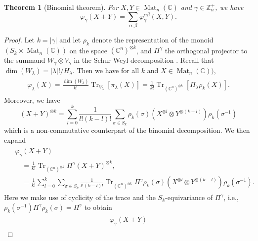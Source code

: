\documentclass[notitlepage, 11pt, letterpaper]{amsart}
\theoremstyle{plain}
\newtheorem{thm}{Theorem}%
\theoremstyle{definition}
\let\cref\crtcref
\DeclareMathOperator{\Tr}{Tr}
\DeclareMathOperator{\Mat}{Mat}
\newcommand{\undomweightsp}[1]{\mathbb Z^{+}_{#1}}
\newcommand{\ot}{\otimes} %
\newcommand{\vp}{\varphi} %
\newcommand{\ya}{\alpha}
\newcommand{\yb}{\beta}
\newcommand{\yc}{\gamma}
\newcommand{\yx}{\lambda}
\newcommand{\syc}{|\yc|}
\newcommand{\syx}{|\yx|}
\begin{document}
\begin{thm}[Binomial theorem]
    \label{thm:the_binomial_theorem}
    For $X,Y \in \Mat_n(\mathbb{C})$ and $\yc \in \undomweightsp{n}$, we have
    \begin{equation}
        \label{eq:varphi_sum_sum}
        \vp_\yc(X+Y)=\sum_{\ya, \yb} \vp^{\ya \yb}_\yc(X, Y).
    \end{equation}
\end{thm}
\begin{proof}
    Let $k=\syc$ and let $\rho_k$ denote the representation of the monoid $(S_k \times \Mat_n(\mathbb{C}))$ on the space $(\mathbb{C}^n)^{\ot k}$, and $\Pi^\yc$ the orthogonal projector to the summand $W_\yc \ot V_\yc$ in the Schur-Weyl decomposition \cref{eq:schur-weyl}.
    Recall that $\dim(W_{\yx}) = \syx! / H_{\yx}$.
    Then we have for all $k$ and $X \in \Mat_n(\mathbb{C}))$,
    \begin{align}
        \begin{split}
            \vp_{\yx}(X)
            = \frac{\dim(W_{\yx})}{k!} \Tr_{V_\yx}[\pi_\yx(X)]
            = \frac{1}{k!} \Tr_{(\mathbb{C}^n)^{\ot k}}[\Pi_{\yx} \rho_{k}(X)].
        \end{split}
    \end{align}
    Moreover, we have
    \begin{equation}
        (X+Y)^{\ot k} = \sum_{l=0}^k \frac{1}{l!(k-l)!}\sum_{\sigma \in S_k} \rho_k(\sigma) (X^{\ot l} \ot Y^{\ot (k-l)})\rho_k(\sigma^{-1})
    \end{equation}
    which is a non-commutative counterpart of the binomial decomposition.
    We then expand
    \begin{align}
        \begin{split}
            &\vp_\yc(X+Y) \\
            &\quad= \frac{1}{k!} \Tr_{(\mathbb{C}^n)^{\ot k}} \Pi^\yc  (X+Y)^{\ot k}, \\
            &\quad= \frac{1}{k!}\sum_{l=0}^k \sum_{\sigma \in S_k} \frac{1}{l! (k-l)!} \Tr_{(\mathbb{C}^n)^{\ot k}} \Pi^\yc \rho_k(\sigma) (X^{\ot l} \ot Y^{\ot (k-l)})\rho_k(\sigma^{-1}).
        \end{split}
    \end{align}
    Here we make use of cyclicity of the trace and the $S_k$-equivariance of $\Pi^{\yc}$, i.e., $\rho_k(\sigma^{-1}) \Pi^\yc \rho_k(\sigma) = \Pi^\yc$ to obtain
    \begin{align}
        \begin{split}
            \vp_\yc(X+Y)

\end{split}
\end{align}
\end{proof}
\end{document}

